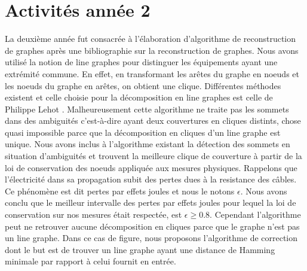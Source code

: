 \documentclass[onecolumn, 12pt]{article}
\begin{document}
\section{Activit\'es ann\'ee 2}
La deuxi\`eme ann\'ee fut consacr\'ee \`a l'\'elaboration d'algorithme de reconstruction de graphes apr\`es une bibliographie sur la reconstruction de graphes. 
Nous avons utilis\'e la notion de line graphes \cite{lineGraphe} pour distinguer les \'equipements ayant une extr\'emit\'e commune. 
En effet, en transformant les ar\^etes du graphe en noeuds et les noeuds du graphe en ar\^etes, on obtient une clique. 
Diff\'erentes m\'ethodes existent et celle choisie pour la d\'ecomposition en line graphes est celle de Philippe Lehot \cite{decompositionEnCliquesParArcs}. Malheureusement cette algorithme ne traite pas les sommets dans des ambiguit\'es c'est-\`a-dire ayant deux couvertures en cliques distints, chose quasi impossible parce que la d\'ecomposition en cliques d'un line graphe est unique. \newline
Nous avons inclus \`a l'algorithme existant la d\'etection des sommets en situation d'ambiguit\'es et trouvent la meilleure clique de couverture \`a partir de la loi de conservation des noeuds appliqu\'ee aux mesures physiques.\newline
Rappelons que l'\'electricit\'e dans sa propagation subit des pertes dues \`a la resistance des c\^ables. Ce ph\'enom\`ene est dit pertes par effets joules et nous le notons $\epsilon$. 
Nous avons conclu que le meilleur intervalle des pertes par effets joules pour lequel la loi de conservation sur nos mesures \'etait respect\'ee, est $\epsilon \ge 0.8$.\newline 
Cependant l'algorithme peut ne retrouver aucune d\'ecomposition en cliques parce que le graphe n'est pas un line graphe. Dans ce cas de figure, nous proposons l'algorithme de correction dont le but est de trouver un line graphe ayant une distance de Hamming minimale par rapport \`a celui fournit en entr\'ee.
\end{document}
